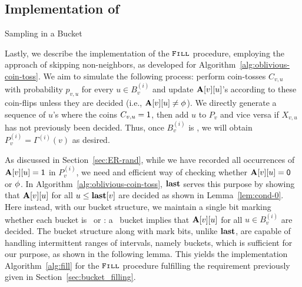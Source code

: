 \subsection{Implementation of }
\label{sec:fill_implement}

\begin{algorithm}[H]
\caption{Sampling in a Bucket}
\begin{algorithmic}
        \Repeat
            \EndIf
\EndProcedure
\end{algorithmic}
\label{alg:fill}
\end{algorithm}

Lastly, we describe the implementation of the $\texttt{\textsc{Fill}}$ procedure, employing the approach of skipping non-neighbors, as developed for Algorithm~\ref{alg:oblivious-coin-toss}. We aim to simulate the following process: perform coin-tosses $C_{v,u}$ with probability $p_{v,u}$ for every $u \in B_v^{(i)}$ and update $\mathbf{A}[v][u]$'s according to these coin-flips unless they are decided (i.e., $\mathbf{A}[v][u] \neq \phi$). We directly generate a sequence of $u$'s where the coins $C_{v,u} = \mathsf{1}$, then add $u$ to $P_v$ and vice versa if $X_{v,u}$ has not previously been decided. Thus, once $B_v^{(i)}$ is \filled, we will obtain $P_v^{(i)} = \Gamma^{(i)}(v)$ as desired.

As discussed in Section~\ref{sec:ER-rand}, while we have recorded all occurrences of $\mathbf{A}[v][u]=\mathsf{1}$ in $P_v^{(i)}$, we need and efficient way of checking whether $\mathbf{A}[v][u] = \mathsf{0}$ or $\phi$. In Algorithm~\ref{alg:oblivious-coin-toss}, $\mathbf{last}$ serves this purpose by showing that $\mathbf{A}[v][u]$ for all $u \leq \mathbf{last}[v]$ are decided as shown in Lemma~\ref{lem:cond-0}. Here instead, with our bucket structure, we maintain a single bit marking whether each bucket is \filled~or \unfilled: a \filled~bucket implies that $\mathbf{A}[v][u]$ for all $u \in B_v^{(i)}$ are decided. The bucket structure along with mark bits, unlike $\mathbf{last}$, are capable of handling intermittent ranges of intervals, namely buckets, which is sufficient for our purpose, as shown in the following lemma. This yields the implementation Algorithm~\ref{alg:fill} for the $\texttt{\textsc{Fill}}$ procedure fulfilling the requirement previously given in Section~\ref{sec:bucket_filling}. 

